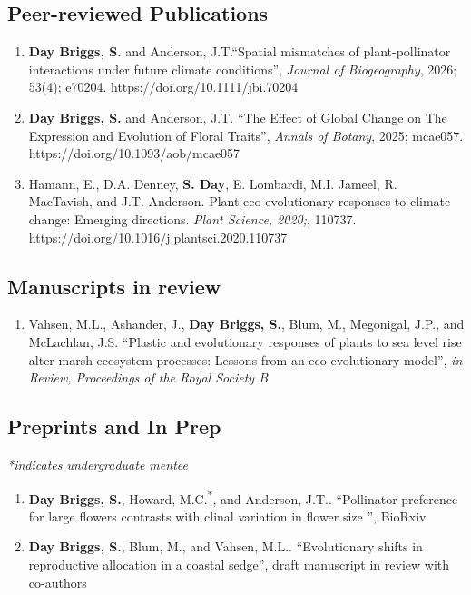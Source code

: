 \documentclass[letterpaper, 11pt]{article}
\begin{document}
\subsection*{Peer-reviewed Publications}

\begin{enumerate}
 \setlength{\itemsep}{4pt}
 \setlength{\parskip}{0pt}
  \item \textbf{Day Briggs, S.} and Anderson, J.T.“Spatial mismatches of plant-pollinator interactions under future climate conditions”, \textit{Journal of Biogeography}, 2026; 53(4); e70204. https://doi.org/10.1111/jbi.70204
 \item \textbf{Day Briggs, S.} and Anderson, J.T. “The Effect of Global Change on The Expression and Evolution of Floral Traits”, \textit{Annals of Botany}, 2025; mcae057. https://doi.org/10.1093/aob/mcae057
 \item Hamann, E., D.A. Denney, \textbf{S. Day}, E. Lombardi, M.I. Jameel, R. MacTavish, and J.T. Anderson. Plant eco-evolutionary responses to climate change: Emerging directions. \textit{Plant Science, 2020;}, 110737. https://doi.org/10.1016/j.plantsci.2020.110737 
 
\end{enumerate}
\subsection*{Manuscripts in review}
\begin{enumerate}
 \item Vahsen, M.L., Ashander, J., \textbf{Day Briggs, S.}, Blum, M., Megonigal, J.P., and McLachlan, J.S. “Plastic and evolutionary responses of plants to sea level rise alter marsh ecosystem processes: Lessons from an eco-evolutionary model”, \textit{in Review, Proceedings of the Royal Society B}
\end{enumerate} 

\subsection*{Preprints and In Prep}
{\small\textit{*indicates undergraduate mentee}}
\begin{enumerate}
\item{\textbf{Day Briggs, S.}}, Howard, M.C.\textsuperscript{*}, and Anderson, J.T.. “Pollinator preference for large flowers contrasts with clinal variation in flower size ”,  BioRxiv
\item {\textbf{Day Briggs, S.}}, Blum, M., and Vahsen, M.L.. “Evolutionary shifts in reproductive allocation in a coastal sedge”,  draft manuscript in review with co-authors
 \end{enumerate} 
\end{document}
